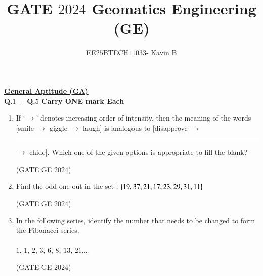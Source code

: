 \documentclass[journal,12pt,onecolumn]{IEEEtran}
\theoremstyle{remark}
\begin{document}
\title{GATE $2024$ Geomatics Engineering (GE)}
\author{EE$25$BTECH$11033$- Kavin B}
\maketitle
\renewcommand{\thefigure}{\theenumi}
\renewcommand{\thetable}{\theenumi}

\underline{\textbf{General Aptitude (GA)}}
\\


\textbf{Q.$1$ $-$ Q.$5$ Carry ONE mark Each}
\vspace{0.5cm}
\begin{enumerate}
\item If `$\rightarrow$' denotes increasing order of intensity, then the meaning of the words [smile $\rightarrow$ giggle $\rightarrow$ laugh] is analogous to [disapprove $\rightarrow$ \rule{2.5cm}{1pt}$\rightarrow$ chide].
Which one of the given options is appropriate to fill the blank?
\begin{enumerate}
\end{enumerate}
\hfill{(GATE GE $2024$)}
\bigskip
\item Find the odd one out in the set : $\left\{19,37,21,17, 23, 29, 31, 11\right\}$
\begin{enumerate}
\end{enumerate}
\hfill{(GATE GE $2024$)}
\bigskip
\item In the following series, identify the number that needs to be changed to form the Fibonacci series.\\
\\
$1$, $1$, $2$, $3$, $6$, $8$, $13$, $21$,...
\begin{enumerate}
\end{enumerate}
\hfill{(GATE GE $2024$)}
\bigskip


\end{enumerate}
\end{document}
